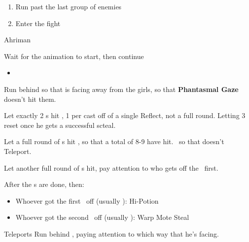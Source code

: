 \begin{menu}
	\party{\vaan}
\end{menu}
\begin{enumerate}[resume]
	\optimize{\vaan}
	\item Run past the last group of enemies
	      \gambiton{\vaan}
	\item Enter the fight
\end{enumerate}
\begin{battle}{Ahriman}
	\begin{itemize}
		{
		\item Wait for the animation to start, then continue
		      }
		      \begin{menu}
			      \begin{itemize}
				      \girlsin
				      \item \GirlsGambitOn
			      \end{itemize}
		      \end{menu}
		      \vaanf Run behind  so that  is facing away from the girls, so that \textbf{Phantasmal Gaze} doesn't hit them.
		\item Let exactly 2 \fira s hit , 1 per cast off of a single Reflect, not a full round. Letting 3 reset
		      \atbresetgirls
		      \battlewait
		      \gambitoff{\vaan} once he gets a successful scteal.
		\item Let a full round of \fira s hit , so that a total of 8-9 have hit.
		      \beliasfreeze\ so that  doesn't Teleport.
		\item Let another full round of \fira s hit, pay attention to who gets off the \fira\ first.
		\item After the \fira s are done, then:
		      \begin{itemize}
			      \item Whoever got the first \fira\ off (usually \penelo): Hi-Potion 
			      \item Whoever got the second \fira\ off (usually \ashe): Warp Mote
			            \vaanf Steal 
		      \end{itemize}
		\item {} Teleports
		      \vaanf Run behind , paying attention to which way that he's facing.

\end{itemize}
\end{battle}
